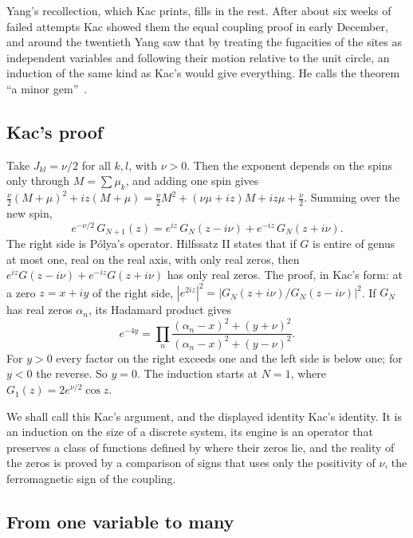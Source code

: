 Yang's recollection, which Kac prints, fills in the rest. After about six weeks of failed attempts Kac showed them the equal coupling proof in early December, and around the twentieth Yang saw that by treating the fugacities of the sites as independent variables and following their motion relative to the unit circle, an induction of the same kind as Kac's would give everything. He calls the theorem ``a minor gem''~\cite[pp.~424 to 426]{Ka74}.

\subsection{Kac's proof}

Take $J_{kl}=\nu/2$ for all $k,l$, with $\nu>0$. Then the exponent depends on the spins only through $M=\sum\mu_k$, and adding one spin gives $\frac\nu2(M+\mu)^2+iz(M+\mu)=\frac\nu2M^2+(\nu\mu+iz)M+iz\mu+\frac\nu2$. Summing over the new spin,
\[
e^{-\nu/2}\,G_{N+1}(z)=e^{iz}\,G_N(z-i\nu)+e^{-iz}\,G_N(z+i\nu).
\]
The right side is P\'olya's operator. Hilfssatz II states that if $G$ is entire of genus at most one, real on the real axis, with only real zeros, then $e^{iz}G(z-i\nu)+e^{-iz}G(z+i\nu)$ has only real zeros. The proof, in Kac's form: at a zero $z=x+iy$ of the right side, $|e^{2iz}|^2=|G_N(z+i\nu)/G_N(z-i\nu)|^2$. If $G_N$ has real zeros $\alpha_n$, its Hadamard product gives
\[
e^{-4y}=\prod_n\frac{(\alpha_n-x)^2+(y+\nu)^2}{(\alpha_n-x)^2+(y-\nu)^2}.
\]
For $y>0$ every factor on the right exceeds one and the left side is below one; for $y<0$ the reverse. So $y=0$. The induction starts at $N=1$, where $G_1(z)=2e^{\nu/2}\cos z$.

We shall call this Kac's argument, and the displayed identity Kac's identity. It is an induction on the size of a discrete system, its engine is an operator that preserves a class of functions defined by where their zeros lie, and the reality of the zeros is proved by a comparison of signs that uses only the positivity of $\nu$, the ferromagnetic sign of the coupling.

\subsection{From one variable to many}

